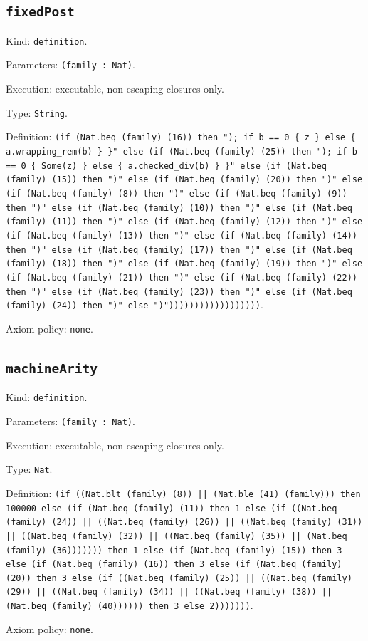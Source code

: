 \documentclass[11pt]{article}
\begin{document}
\subsection*{\texttt{fixedPost}}
\noindent Kind: \texttt{definition}.\par
\noindent Parameters: \texttt{(family : Nat)}.\par
\noindent Execution: executable, non-escaping closures only.\par
\noindent Type: \texttt{String}.\par
\noindent Definition: \texttt{(if (Nat.beq (family) (16)) then "); if b == 0 \{ z \} else \{ a.wrapping\_rem(b) \} \}" else (if (Nat.beq (family) (25)) then "); if b == 0 \{ Some(z) \} else \{ a.checked\_div(b) \} \}" else (if (Nat.beq (family) (15)) then ")" else (if (Nat.beq (family) (20)) then ")" else (if (Nat.beq (family) (8)) then ")" else (if (Nat.beq (family) (9)) then ")" else (if (Nat.beq (family) (10)) then ")" else (if (Nat.beq (family) (11)) then ")" else (if (Nat.beq (family) (12)) then ")" else (if (Nat.beq (family) (13)) then ")" else (if (Nat.beq (family) (14)) then ")" else (if (Nat.beq (family) (17)) then ")" else (if (Nat.beq (family) (18)) then ")" else (if (Nat.beq (family) (19)) then ")" else (if (Nat.beq (family) (21)) then ")" else (if (Nat.beq (family) (22)) then ")" else (if (Nat.beq (family) (23)) then ")" else (if (Nat.beq (family) (24)) then ")" else ")"))))))))))))))))))}.\par
\noindent Axiom policy: \texttt{none}.\par
\subsection*{\texttt{machineArity}}
\noindent Kind: \texttt{definition}.\par
\noindent Parameters: \texttt{(family : Nat)}.\par
\noindent Execution: executable, non-escaping closures only.\par
\noindent Type: \texttt{Nat}.\par
\noindent Definition: \texttt{(if ((Nat.blt (family) (8)) || (Nat.ble (41) (family))) then 100000 else (if (Nat.beq (family) (11)) then 1 else (if ((Nat.beq (family) (24)) || ((Nat.beq (family) (26)) || ((Nat.beq (family) (31)) || ((Nat.beq (family) (32)) || ((Nat.beq (family) (35)) || (Nat.beq (family) (36))))))) then 1 else (if (Nat.beq (family) (15)) then 3 else (if (Nat.beq (family) (16)) then 3 else (if (Nat.beq (family) (20)) then 3 else (if ((Nat.beq (family) (25)) || ((Nat.beq (family) (29)) || ((Nat.beq (family) (34)) || ((Nat.beq (family) (38)) || (Nat.beq (family) (40)))))) then 3 else 2)))))))}.\par
\noindent Axiom policy: \texttt{none}.\par
\end{document}
